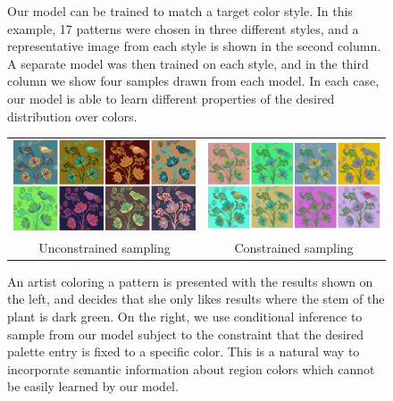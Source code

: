 \begin{figure}[ht]
\caption{Our model can be trained to match a target color style. In this example, 17 patterns were chosen in three different styles, and a representative image from each style is shown in the second column. A separate model was then trained on each style, and in the third column we show four samples drawn from each model. In each case, our model is able to learn different properties of the desired distribution over colors.}
\label{fig:styleTraining}
\vspace{-1.0em}
\end{figure}

\begin{figure}[ht]
\begin{tabular}{cc} 
\includegraphics[width=.475\linewidth]{figs/constrainedSearchUnconstrained}&\includegraphics[width=.475\linewidth]{figs/constrainedSearchConstrained}\\
Unconstrained sampling&Constrained sampling\\
\end{tabular}

\caption{An artist coloring a pattern is presented with the results shown on the left, and decides that she only likes results where the stem of the plant is dark green. On the right, we use conditional inference to sample from our model subject to the constraint that the desired palette entry is fixed to a specific color. This is a natural way to incorporate semantic information about region colors which cannot be easily learned by our model.}
\label{fig:constrainedInference}
\vspace{-1.0em}
\end{figure}

